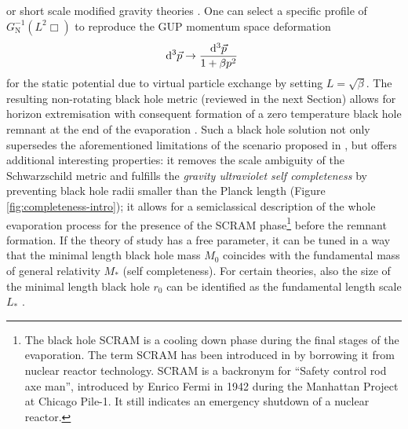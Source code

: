 \cite{ADD02,DHK07,Bar05,Bar12} or short scale modified gravity theories 
\cite{GHS10,MMN11,Nic12,CMN14,FKN16}. One can select a specific 
profile of $G_\mathrm{N}^{-1}\left(L^2\Box\right)$ to reproduce the GUP 
momentum space deformation
\begin{equation}
\diff^3 \vec{p} \to \frac{\diff^3 \vec{p}}{1+\beta p^2}\ 
\label{eq:kempf}
\end{equation}
for the static potential due to virtual particle exchange by setting 
$L=\sqrt{\beta}$. The resulting non-rotating black hole metric
(reviewed in the next Section) allows for 
horizon extremisation with consequent formation of a zero temperature black 
hole remnant at the end of the evaporation \cite{IMN13}. Such a black hole 
solution not only supersedes the aforementioned limitations of the scenario 
proposed in \cite{AdS99,APS01}, but offers additional interesting properties: 
it removes the scale ambiguity of the Schwarzschild metric and fulfills the 
\emph{gravity ultraviolet self completeness} by preventing black hole radii smaller 
than the Planck length (Figure \ref{fig:completeness-intro});
it allows for a semiclassical description of the whole 
evaporation process for the presence of the SCRAM phase\footnote{The black hole 
	SCRAM is a cooling down phase during the final stages of the evaporation. The 
	term SCRAM has been introduced in \cite{Nic09} by borrowing it from nuclear 
	reactor technology. SCRAM is a backronym for ``Safety control rod axe man'', 
	introduced by Enrico Fermi in 1942 during the Manhattan Project at Chicago 
	Pile-1. It still indicates an emergency shutdown of a nuclear reactor.} before 
the remnant formation. If the theory of study has a free parameter, it can be
tuned in a way that the minimal length black hole mass $M_0$ coincides with the
fundamental mass of general relativity $M_*$ (self completeness). For certain
theories, also the size of the minimal length black hole $r_0$ can be identified
as the fundamental length scale $L_*$ \cite{FKN16}.



